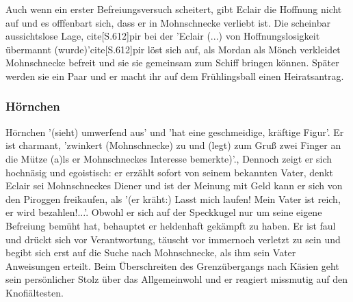 Auch wenn ein erster Befreiungsversuch scheitert, gibt Eclair die Hoffnung nicht auf und es offfenbart sich, dass er in Mohnschnecke verliebt ist. \cite[S.603]{pir} Die scheinbar aussichtslose Lage, cite[S.612]{pir} bei der 'Eclair (...) von Hoffnungslosigkeit übermannt (wurde)'cite[S.612]{pir} löst sich auf, als Mordan als Mönch verkleidet Mohnschnecke befreit und sie sie gemeinsam zum Schiff bringen können.\cite[S.614]{pir} Später werden sie ein Paar \cite[S.631ff]{pir} und er macht ihr auf dem Frühlingsball einen Heiratsantrag.\cite[S.640ff]{pir }

\subsubsection{Hörnchen}

Hörnchen '(sieht) umwerfend aus' \cite[S.25]{pir}  und 'hat eine geschmeidige, kräftige Figur'.\cite[S.25]{pir } Er ist charmant, 'zwinkert (Mohnschnecke) zu und (legt) zum Gruß zwei Finger an die Mütze (a)ls er Mohnschneckes Interesse bemerkte)'.\cite[S.25]{pir}, Dennoch zeigt er sich hochnäsig und egoistisch: er erzählt sofort von seinem bekannten Vater\cite[S.25]{pir}, denkt Eclair sei Mohnschneckes Diener \cite[S.26]{pir} und ist der Meinung mit Geld kann er sich von den Piroggen freikaufen, als '(er kräht:) Lasst mich laufen! Mein Vater ist reich, er wird bezahlen!...'.\cite[S.34]{pir} Obwohl er sich auf der Speckkugel nur um seine eigene Befreiung bemüht hat, behauptet er heldenhaft gekämpft zu haben.\cite[S.40]{pir} Er ist faul und drückt sich vor Verantwortung, täuscht vor immernoch verletzt zu sein \cite[S.62f]{pir} und begibt sich erst auf die Suche nach Mohnschnecke, als ihm sein Vater Anweisungen erteilt.\cite[S.83ff]{pir} Beim Überschreiten des Grenzübergangs nach Käsien geht sein persönlicher Stolz über das Allgemeinwohl und er reagiert missmutig auf den Knofiältesten.\cite[S.142f]{pir}
